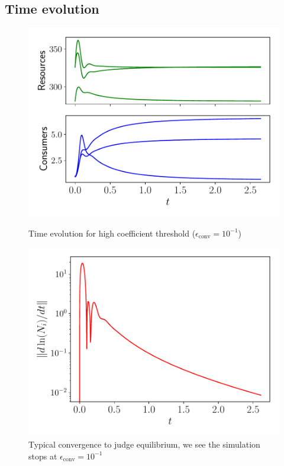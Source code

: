 \documentclass[12pt, titlepage]{report}
\begin{document}
\subsection{Time evolution}
\begin{figure}[h!]
\centering
\includegraphics[width=0.6\linewidth]{Typical_time_evolution/Typical_time_evolution_resources_species_high_threshold.pdf}
\caption{Time evolution for high coefficient threshold ($\epsilon_{\text{conv}}=10^{-1}$)}
\includegraphics[width=0.6\linewidth]{figures/Typical_time_evolution/Typical_time_evolution_log_derivative_high_threshold.pdf}
\caption{Typical convergence to judge equilibrium, we see the simulation stops at $\epsilon_{\text{conv}}=10^{-1}$}
\end{figure}
\end{document}
